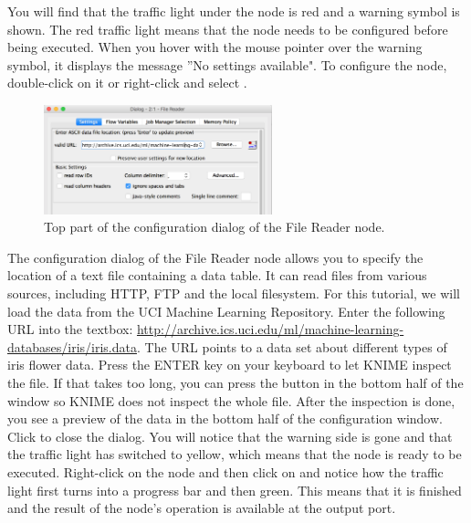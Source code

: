 You will find that the traffic light under the node is red and a warning symbol is shown. The red traffic light means that the node needs to be configured before being executed. When you hover with the mouse pointer over the warning symbol, it displays the message ''No settings available". To configure the node, double-click on it or right-click and select .

\begin{figure}[h]
\centering
\includegraphics[width=0.59\textwidth]{graphics/knime_basics/config}
\caption{Top part of the configuration dialog of the File Reader node.}
\label{fig:config}
\end{figure}

The configuration dialog of the File Reader node allows you to specify the location of a text file containing a data table. It can read files from various sources, including HTTP, FTP and the local filesystem. For this tutorial, we will load the data from the UCI Machine Learning Repository. Enter the following URL into the textbox: \url{http://archive.ics.uci.edu/ml/machine-learning-databases/iris/iris.data}. The URL points to a data set about different types of iris flower data. Press the ENTER key on your keyboard to let KNIME inspect the file. If that takes too long, you can press the  button in the bottom half of the window so KNIME does not inspect the whole file. After the inspection is done, you see a preview of the data in the bottom half of the configuration window. Click  to close the dialog. You will notice that the warning side is gone and that the traffic light has switched to yellow, which means that the node is ready to be executed. Right-click on the node and then click on  and notice how the traffic light first turns into a progress bar and then green. This means that it is finished and the result of the node's operation is available at the output port.


